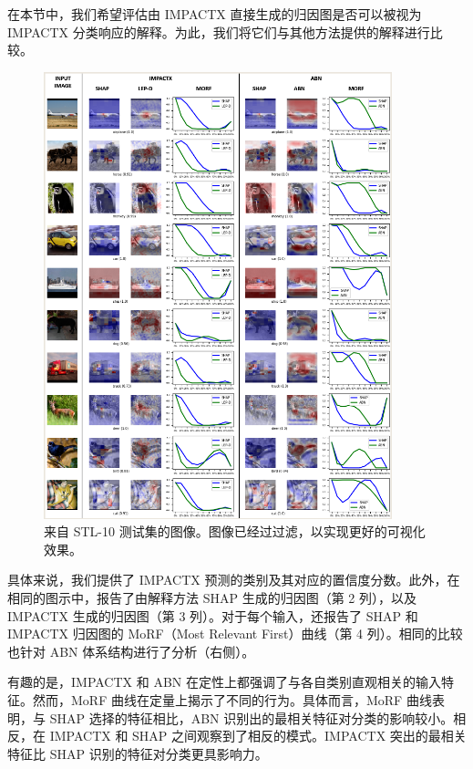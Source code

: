 \documentclass[12pt, a4paper]{ctexart} %
\begin{document}
在本节中，我们希望评估由 IMPACTX 直接生成的归因图是否可以被视为 IMPACTX 分类响应的解释。为此，我们将它们与其他方法提供的解释进行比较。
\begin{figure}[H]
  \centering
  \includegraphics[width=0.9\textwidth]{img/IMPACTX_5.png}
  \caption{来自 STL-10 测试集的图像。图像已经过过滤，以实现更好的可视化效果。}
\end{figure}
具体来说，我们提供了 IMPACTX 预测的类别及其对应的置信度分数。此外，在相同的图示中，报告了由解释方法 SHAP 生成的归因图（第 2 列），以及 IMPACTX 生成的归因图（第 3 列）。对于每个输入，还报告了 SHAP 和 IMPACTX 归因图的 MoRF（Most Relevant First）曲线（第 4 列）。相同的比较也针对 ABN 体系结构进行了分析（右侧）。

有趣的是，IMPACTX 和 ABN 在定性上都强调了与各自类别直观相关的输入特征。然而，MoRF 曲线在定量上揭示了不同的行为。具体而言，MoRF 曲线表明，与 SHAP 选择的特征相比，ABN 识别出的最相关特征对分类的影响较小。相反，在 IMPACTX 和 SHAP 之间观察到了相反的模式。IMPACTX 突出的最相关特征比 SHAP 识别的特征对分类更具影响力。
\end{document}
